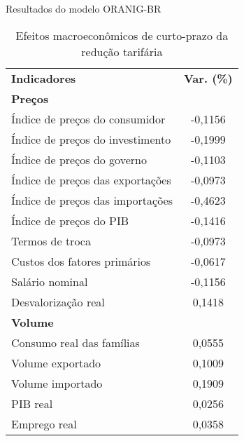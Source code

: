 \documentclass[10pt]{sintefbeamer}
\begin{document}
\begin{frame}{Resultados do modelo ORANIG-BR}
	\begin{table}[h]
		\centering
		\scriptsize
		\begin{threeparttable}
			\caption{Efeitos macroeconômicos de curto-prazo da redução tarifária} \label{tab:result}
			\begin{tabular}{m{8cm}c}
				\hline
				\multirow{2}{*}{\textbf{Indicadores}} & \multirow{2}{*}{\textbf{Var. (\%)}} \\
				 &  \\ \hline
				\textbf{Preços} &  \\
				\hspace{0.2cm} Índice de preços do consumidor & -0,1156 \\
				\hspace{0.2cm} Índice de preços do investimento & -0,1999 \\
				\hspace{0.2cm} Índice de preços do governo & -0,1103 \\
				\hspace{0.2cm} Índice de preços das exportações & -0,0973 \\
				\hspace{0.2cm} Índice de preços das importações & -0,4623 \\
				\hspace{0.2cm} Índice de preços do PIB & -0,1416 \\
				\hspace{0.2cm} Termos de troca & -0,0973 \\
				\hspace{0.2cm} Custos dos fatores primários & -0,0617 \\
				\hspace{0.2cm} Salário nominal & -0,1156 \\
				\hspace{0.2cm} Desvalorização real & 0,1418 \\ \hline
				\textbf{Volume} &  \\
				\hspace{0.2cm} Consumo real das famílias & 0,0555 \\
				\hspace{0.2cm} Volume exportado & 0,1009 \\
				\hspace{0.2cm} Volume importado & 0,1909 \\
				\hspace{0.2cm} PIB real & 0,0256 \\
				\hspace{0.2cm} Emprego real & 0,0358 \\ \hline
			\end{tabular}
		\end{threeparttable}
	\end{table}
\end{frame}
\end{document}
